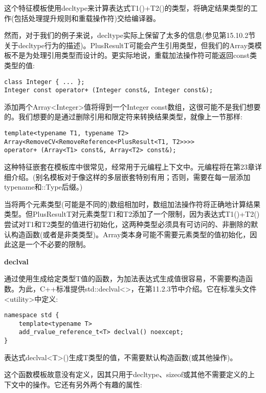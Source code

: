 这个特征模板使用decltype来计算表达式T1()+T2()的类型，将确定结果类型的工作(包括处理提升规则和重载操作符)交给编译器。

然而，对于我们的例子来说，decltype实际上保留了太多的信息(参见第15.10.2节关于decltype行为的描述)。PlusResultT可能会产生引用类型，但我们的Array类模板不是为处理引用类型而设计的。更实际地说，重载加法操作符可能返回const类类型的值:

\begin{lstlisting}[style=styleCXX]
class Integer { ... };
Integer const operator+ (Integer const&, Integer const&);
\end{lstlisting}

添加两个Array<Integer>值将得到一个Integer const数组，这很可能不是我们想要的。我们想要的是通过删除引用和限定符来转换结果类型，就像上一节那样:

\begin{lstlisting}[style=styleCXX]
template<typename T1, typename T2>
Array<RemoveCV<RemoveReference<PlusResult<T1, T2>>>>
operator+ (Array<T1> const&, Array<T2> const&);
\end{lstlisting}

这种特征嵌套在模板库中很常见，经常用于元编程上下文中。元编程将在第23章详细介绍。(别名模板对于像这样的多层嵌套特别有用；否则，需要在每一层添加typename和::Type后缀。)

当将两个元素类型(可能是不同的)数组相加时，数组加法操作符将正确地计算结果类型。但PlusResultT对元素类型T1和T2添加了一个限制，因为表达式T1()+T2()尝试对T1和T2类型的值进行初始化，这两种类型必须具有可访问的、非删除的默认构造函数(或者是非类类型)。Array类本身可能不需要元素类型的值初始化，因此这是一个不必要的限制。

\noindent
\textbf{declval}

通过使用生成给定类型T值的函数，为加法表达式生成值很容易，不需要构造函数。为此，C++标准提供std::declval<>，在第11.2.3节中介绍。它在标准头文件<utility>中定义:

\begin{lstlisting}[style=styleCXX]
namespace std {
	template<typename T>
	add_rvalue_reference_t<T> declval() noexcept;
}
\end{lstlisting}

表达式declval<T>()生成T类型的值，不需要默认构造函数(或其他操作)。

这个函数模板故意没有定义，因其只用于decltype、sizeof或其他不需要定义的上下文中的操作。它还有另外两个有趣的属性:

